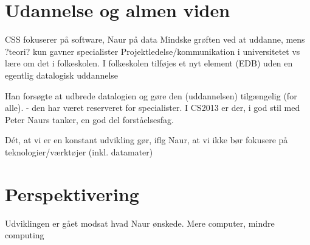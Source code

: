 \section{Udannelse og almen viden}
CSS fokuserer på software, Naur på data
Mindske grøften ved at uddanne, mens ?teori? kun gavner specialister
Projektledelse/kommunikation i universitetet vs lære om det i folkeskolen.
I folkeskolen tilføjes et nyt element (EDB) uden en egentlig datalogisk uddannelse

Han forsøgte at udbrede datalogien og gøre den (uddannelsen) tilgængelig (for alle).
 - den har været reserveret for specialister.
I CS2013 er der, i god stil med Peter Naurs tanker, en god del forståelsesfag.

Dét, at vi er en konstant udvikling gør, iflg Naur, at vi ikke bør fokusere på teknologier/værktøjer (inkl. datamater)

\section{Perspektivering}
Udviklingen er gået modsat hvad Naur ønskede. Mere computer, mindre computing

